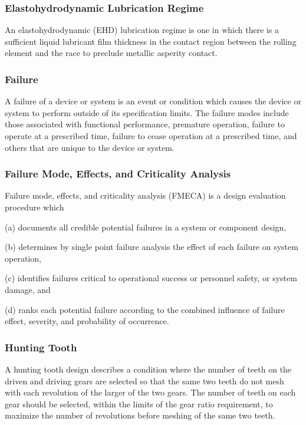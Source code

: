 \documentclass[12pt]{article}
\begin{document}
\subsubsection{Elastohydrodynamic Lubrication Regime}
An elastohydrodynamic (EHD) lubrication regime is one in which there is a sufficient liquid lubricant film thickness in the contact region between the rolling element and the race to preclude metallic asperity contact.

\subsubsection{Failure}
A failure of a device or system is an event or condition which causes the device or system to perform outside of its specification limits. 
The failure modes include those associated with functional performance, premature operation, failure to operate at a prescribed time, failure to cease operation at a prescribed time, and others that are unique to the device or system.

\subsubsection{Failure Mode, Effects, and Criticality Analysis}
Failure mode, effects, and criticality analysis (FMECA) is a design evaluation procedure which 

(a) documents all credible potential failures in a system or component design, 

(b) determines by single point failure analysis the effect of each failure on system operation, 

(c) identifies failures critical to operational success or personnel safety, or system damage, and 

(d) ranks each potential failure according to the combined influence of failure effect, severity, and probability of occurrence.

\subsubsection{Hunting Tooth}
A hunting tooth design describes a condition where the number of teeth on the driven and driving gears are selected so that the same two teeth do not mesh with each revolution of the larger of the two gears. 
The number of teeth on each gear should be selected, within the limits of the gear ratio requirement, to maximize the number of revolutions before meshing of the same two teeth.
\end{document}
